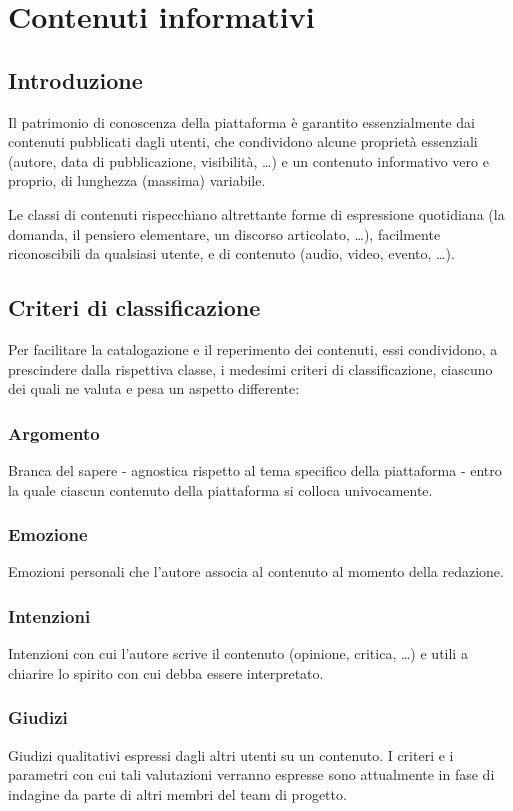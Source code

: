 \documentclass[10pt,a4paper,headinclude,footinclude,hidelinks]{scrreprt} %
\begin{document}
	\tableofcontents

	\chapter{Contenuti informativi}
	\label{ch:stage:contenuti}
	\section{Introduzione}
	Il patrimonio di conoscenza della piattaforma è garantito essenzialmente dai contenuti pubblicati dagli utenti, che condividono alcune proprietà essenziali (autore, data di pubblicazione, visibilità, \ldots) e un contenuto informativo vero e proprio, di lunghezza (massima) variabile.

	Le classi di contenuti rispecchiano altrettante forme di espressione quotidiana (la domanda, il pensiero elementare, un discorso articolato, \ldots), facilmente riconoscibili da qualsiasi utente, e di contenuto (audio, video, evento, \ldots).

	\section{Criteri di classificazione}
	Per facilitare la catalogazione e il reperimento dei contenuti, essi condividono, a prescindere dalla rispettiva classe, i medesimi criteri di classificazione, ciascuno dei quali ne valuta e pesa un aspetto differente:
	\subsection{Argomento}
	Branca del sapere - agnostica rispetto al tema specifico della piattaforma - entro la quale ciascun contenuto della piattaforma si colloca univocamente.
	\subsection{Emozione}
	Emozioni personali che l'autore associa al contenuto al momento della redazione.
	\subsection{Intenzioni}
	Intenzioni con cui l'autore scrive il contenuto (opinione, critica, \ldots) e utili a chiarire lo spirito con cui debba essere interpretato.
	\subsection{Giudizi}
	Giudizi qualitativi espressi dagli altri utenti su un contenuto. I criteri e i parametri con cui tali valutazioni verranno espresse sono attualmente in fase di indagine da parte di altri membri del team di progetto.
\end{document}
